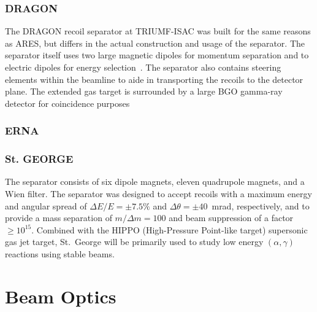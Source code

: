 \subsubsection{DRAGON}

The DRAGON recoil separator at TRIUMF-ISAC was built for the same reasons as ARES,
but differs in the actual construction and usage of the separator.
The separator
itself uses two large magnetic dipoles for momentum separation and to electric
dipoles for energy selection~\cite{Engel2005}. The separator also contains
steering elements within the beamline to aide in transporting the recoils to
the detector plane. The extended gas target is surrounded by a large BGO
gamma-ray detector for coincidence purposes

\subsubsection{ERNA}



\subsubsection{St. GEORGE}
The separator consists of six dipole magnets, eleven quadrupole magnets, and a
Wien filter. The separator was designed to accept recoils with a maximum
energy and angular spread of $\Delta E/E = \pm7.5\%$ and
$\Delta\theta = \pm40$~mrad, respectively, and to provide a mass separation
of $m/\Delta m = 100$ and beam suppression of a factor $\geq 10^{15}$. Combined
with the HIPPO (High-Pressure Point-like target) supersonic gas jet target,
St.\ George will be primarily used to study low energy $(\alpha,\gamma)$
reactions using stable beams.



\section{Beam Optics}

